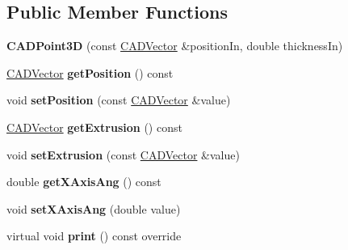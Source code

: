 \subsection*{Public Member Functions}
\begin{DoxyCompactItemize}
\item 
{\bfseries C\+A\+D\+Point3D} (const \hyperlink{class_c_a_d_vector}{C\+A\+D\+Vector} \&position\+In, double thickness\+In)\hypertarget{class_c_a_d_point3_d_a2b90070589b8f309581c7ce40154b492}{}\label{class_c_a_d_point3_d_a2b90070589b8f309581c7ce40154b492}

\item 
\hyperlink{class_c_a_d_vector}{C\+A\+D\+Vector} {\bfseries get\+Position} () const \hypertarget{class_c_a_d_point3_d_a82f9c92dd7ef5e927993e69e83279e5e}{}\label{class_c_a_d_point3_d_a82f9c92dd7ef5e927993e69e83279e5e}

\item 
void {\bfseries set\+Position} (const \hyperlink{class_c_a_d_vector}{C\+A\+D\+Vector} \&value)\hypertarget{class_c_a_d_point3_d_a46a65c6b3466d9dca9e0827b011f418e}{}\label{class_c_a_d_point3_d_a46a65c6b3466d9dca9e0827b011f418e}

\item 
\hyperlink{class_c_a_d_vector}{C\+A\+D\+Vector} {\bfseries get\+Extrusion} () const \hypertarget{class_c_a_d_point3_d_ae1ab182fd97f2317c50c7dac4931f1d3}{}\label{class_c_a_d_point3_d_ae1ab182fd97f2317c50c7dac4931f1d3}

\item 
void {\bfseries set\+Extrusion} (const \hyperlink{class_c_a_d_vector}{C\+A\+D\+Vector} \&value)\hypertarget{class_c_a_d_point3_d_adb460d9f84c10c14967d61807740abdc}{}\label{class_c_a_d_point3_d_adb460d9f84c10c14967d61807740abdc}

\item 
double {\bfseries get\+X\+Axis\+Ang} () const \hypertarget{class_c_a_d_point3_d_a1dfcad378f108a7022c5ffd5c357d631}{}\label{class_c_a_d_point3_d_a1dfcad378f108a7022c5ffd5c357d631}

\item 
void {\bfseries set\+X\+Axis\+Ang} (double value)\hypertarget{class_c_a_d_point3_d_a9b24c0bbe8a41c5cbb07a704cb5c74e9}{}\label{class_c_a_d_point3_d_a9b24c0bbe8a41c5cbb07a704cb5c74e9}

\item 
virtual void {\bfseries print} () const  override\hypertarget{class_c_a_d_point3_d_a5a6bb085f069b7c93488f0ea442fdd29}{}\label{class_c_a_d_point3_d_a5a6bb085f069b7c93488f0ea442fdd29}

\end{DoxyCompactItemize}
